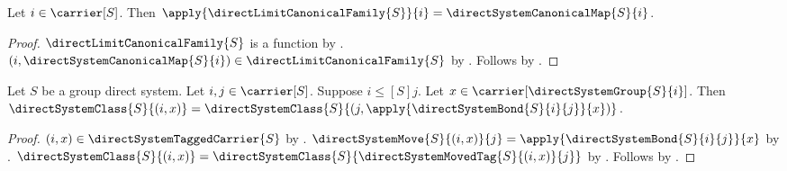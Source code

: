\begin{proposition}\label{direct_limit_canonical_family_apply}
    Let $i\in\carrier[S]$.
    Then $\apply{\directLimitCanonicalFamily{S}}{i}
        =\directSystemCanonicalMap{S}{i}$.
\end{proposition}
\begin{proof}
    $\directLimitCanonicalFamily{S}$ is a function by
        .
    $(i,\directSystemCanonicalMap{S}{i})\in
        \directLimitCanonicalFamily{S}$ by
        .
    Follows by .
\end{proof}

\begin{lemma}\label{direct_system_class_bond}
    Let $S$ be a group direct system.
    Let $i,j\in\carrier[S]$.
    Suppose $i\mathrel{\leq[S]}j$.
    Let $x\in\carrier[\directSystemGroup{S}{i}]$.
    Then $\directSystemClass{S}{(i,x)}=
        \directSystemClass{S}
            {(j,\apply{\directSystemBond{S}{i}{j}}{x})}$.
\end{lemma}
\begin{proof}
    $(i,x)\in\directSystemTaggedCarrier{S}$ by
        .
    $\directSystemMove{S}{(i,x)}{j}
        =\apply{\directSystemBond{S}{i}{j}}{x}$ by
        .
    $\directSystemClass{S}{(i,x)}=
        \directSystemClass{S}{\directSystemMovedTag{S}{(i,x)}{j}}$ by
        .
    Follows by .
\end{proof}

